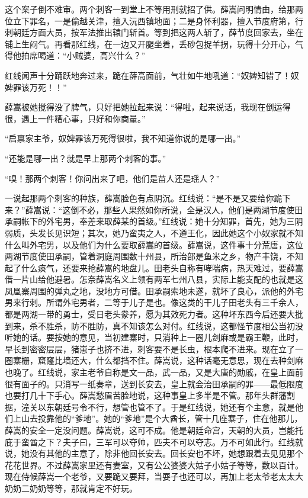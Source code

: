 这个案子倒不难审。两个刺客一到堂上不等用刑就招了供。薛嵩问明情由，给那两位立下罪名，一是偷越关津，擅入沅西镇地面；二是身怀利器，擅入节度府第，行刺朝廷方面大员，按军法推出辕门斩首。等到把这两人斩了，薛节度回家去，坐在铺上生闷气。再看那红线，在一边又开腿坐着，丢砂包捉羊拐，玩得十分开心，气得他拍席喝道：“小贼婆，高兴什么？” 

红线闻声十分踊跃地奔过来，跪在薛高面前，气壮如牛地吼道：“奴婢知错了！奴婢罪该万死！！” 

薛嵩被她搅得没了脾气，只好把她拉起来说：“得啦，起来说话，我现在倒运得很，遇上一件糟心事，只好和你商量。” 

“启禀家主爷，奴婢罪该万死得很啦，我不知道你说的是哪一出。” 

“还能是哪一出？就是早上那两个刺客的事。” 

“嗅！那两个刺客！你问出来了吧，他们是苗人还是瑶人？” 

一说起那两个刺客的种族，薛嵩脸色有点阴沉。红线说：“是不是又要给你跪下来？”薛嵩说：“这倒不必，那些人果然如你所说，全是汉人，他们是两湖节度使田承嗣帐下的外宅男，奉差来取薛某的首级。”红线说：她十分知罪，首先，她为三阴弱质，头发长见识短；其次，她乃蛮夷之人，不遵王化，因此她这个小奴家就不知什么叫外宅男，以及他们为什么要取薛嵩的首级。薛嵩说，这件事十分荒唐，这位两湖节度使田承嗣，管着洞庭周围数十州县，所治部是鱼米之乡，物产丰饶，不知起了什么痰气，还要来抢薛嵩的地盘儿。田老头自称有哮喘病，热天难过，要薛嵩借一片山给他避暑。怎奈薛嵩名义上领有两军七州八县，实际上能支配的也就是这凤凰寨周围的弹丸之地，没地方可借。田承嗣索地未遂，就坏了良心，派他的外宅男来行刺。所谓外宅男者，二等于儿子是也。像这类的干儿子田老头有三千余人，都是两湖一带的勇士，受日老头豢养，愿为其效死力者。这种坏东西今后还要大批到来，杀不胜杀，防不胜防，真不知该怎么对付。红线说，这都怪节度相公当初没听她的话。要按她的意见，当初建寨时，只消种上一圈儿剑麻或是霸王鞭，此时，早长到密密层层，猪崽子也挤不进，刺客要不是长虫，根本爬不进来。现在立了一圈寨栅，窟窿比墙还大，什么都挡不住。薛嵩说，这种话毫无意思，现在去种剑麻也晚了。红线说，家主老爷自称是文一品，武一品，又是大唐的勋戚，在皇上面前很有面子的。只消写一纸奏章，送到长安去，皇上就会治田承嗣的罪——最低限度也要打几十下手心。薛嵩愁眉苦脸地说，这种事皇上多半是不管。那年头群藩割据，潼关以东朝廷号令不行，想管也管不了。于是红线说，她还有个主意，就是他们上山去投靠他的“爹地”。她的“爹地”是个大酋长，管十几座寨子，住在他那儿，薛嵩的安全一定没问题。薛嵩说，这可不成。他是朝廷命宫，天朝的大员，岂能托庇于蛮酋之下？夫子曰，三军可以夺帅，匹夫不可以夺志。万不可如此行。红线就说，她没有其他的主意了，除非他回长安去。回长安也不坏，她想跟着去见见那个花花世界。不过薛嵩家里还有妻室，又有公公婆婆大姑子小姑子等等，数以百计。现在侍候薛嵩一个老爷，又要跪又要拜，当耍子也还可以，再加上老太爷老太太大奶奶二奶奶等等，那就肯定不好玩。 

